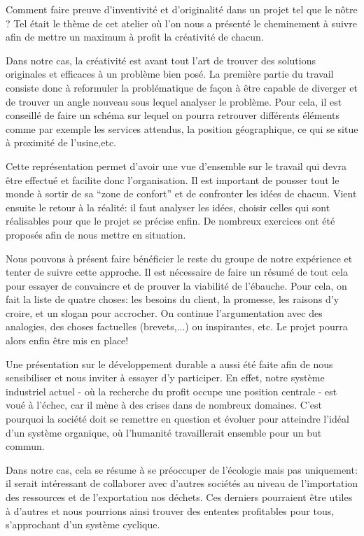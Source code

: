 \documentclass[a4paper, oneside, 12pt]{article}
\begin{document}
Comment faire preuve d'inventivité et d'originalité dans un projet tel que le nôtre ?
Tel était le thème de cet atelier où l'on nous a présenté le cheminement 
à suivre afin de mettre un maximum à profit la créativité de chacun.

Dans notre cas, la créativité est avant tout l'art de trouver des solutions 
originales et efficaces à un problème bien posé. 
La première partie du travail consiste donc à reformuler la problématique de façon 
à être capable de diverger et de trouver un angle nouveau sous lequel analyser le problème. 
Pour cela, il est conseillé de faire un schéma sur lequel on pourra retrouver différents
éléments comme par exemple les services attendus, la position géographique, 
ce qui se situe à proximité de l’usine,etc.

Cette représentation permet d'avoir une vue d'ensemble sur le travail qui 
devra être effectué et facilite donc l'organisation. Il est important de pousser tout
le monde à sortir de sa ``zone de confort'' et de confronter les idées de chacun.
Vient ensuite le retour à la réalité: il faut analyser les idées, choisir celles qui 
sont réalisables pour que le projet se précise enfin. De nombreux exercices ont été 
proposés afin de nous mettre en situation. 

Nous pouvons à présent faire bénéficier le reste du groupe de notre expérience et tenter
de suivre cette approche. Il est nécessaire de faire un résumé de tout cela pour essayer 
de convaincre et de prouver la viabilité de l'ébauche. Pour cela, on fait la liste 
de quatre choses: les besoins du client, la promesse, les raisons d'y croire, 
et un slogan pour accrocher. On continue l'argumentation avec des analogies,
des choses factuelles (brevets,...) ou inspirantes, etc. Le projet pourra alors
enfin être mis en place!

Une présentation sur le développement durable a aussi été faite afin de nous sensibiliser
et nous inviter à essayer d'y participer. 
En effet, notre système industriel actuel - où la recherche du profit occupe une position
centrale - est voué à l'échec, car il mène à des crises dans de nombreux domaines.
C'est pourquoi la société doit se remettre en question et évoluer pour atteindre
l'idéal d'un système organique, où l'humanité travaillerait ensemble pour un but commun. 

Dans notre cas, cela se résume à se préoccuper de l'écologie mais pas uniquement:
il serait intéressant de collaborer avec d'autres sociétés au niveau de l'importation
des ressources et de l'exportation nos déchets. Ces derniers pourraient être utiles
à d'autres et nous pourrions ainsi trouver des ententes profitables pour tous,
s'approchant d'un système cyclique.
\end{document}
